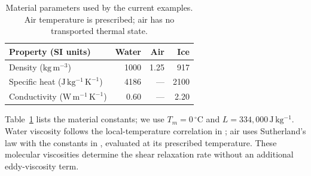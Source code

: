 \begin{table}[t]
      \caption{Material parameters used by the current examples. Air temperature
            is prescribed; air has no transported thermal state.}
      \label{tab:materials}
      \begin{tabular}{lrrr}
            \toprule
            Property (SI units)                           & Water & Air  & Ice  \\
            \midrule
            Density ($\mathrm{kg\,m^{-3}}$)               & 1000  & 1.25 & 917  \\
            Specific heat ($\mathrm{J\,kg^{-1}\,K^{-1}}$) & 4186  & ---  & 2100 \\
            Conductivity ($\mathrm{W\,m^{-1}\,K^{-1}}$)   & 0.60  & ---  & 2.20 \\
            \bottomrule
      \end{tabular}
\end{table}
Table~\ref{tab:materials} lists the material constants; we use
$T_m=0\,{}^{\circ}\mathrm C$ and $L=334{,}000\,\mathrm{J\,kg^{-1}}$.
Water viscosity follows the local-temperature correlation in
\citet[Eq.~(7)]{IAPWS2011}; air uses Sutherland's law with the constants
in \citet{NASA2025}, evaluated at its prescribed temperature.
These molecular viscosities determine the
shear relaxation rate without an additional eddy-viscosity term.

